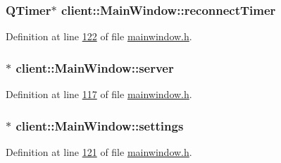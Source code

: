 \hypertarget{classclient_1_1_main_window_a5ee3a3827379da6df9f7e0348fa9d91d}{
\subsubsection[{reconnect\-Timer}]{\setlength{\rightskip}{0pt plus 5cm}Q\-Timer$\ast$ client\-::\-Main\-Window\-::reconnect\-Timer\hspace{0.3cm}{\ttfamily [private]}}}\label{d2/da4/classclient_1_1_main_window_a5ee3a3827379da6df9f7e0348fa9d91d}


Definition at line \hyperlink{mainwindow_8h_source_l00122}{122} of file \hyperlink{mainwindow_8h_source}{mainwindow.\-h}.

\hypertarget{classclient_1_1_main_window_a4766f55e461fd529caa84bf953e5151c}{
\subsubsection[{server}]{$\ast$ client\-::\-Main\-Window\-::server\hspace{0.3cm}{\ttfamily [private]}}}\label{d2/da4/classclient_1_1_main_window_a4766f55e461fd529caa84bf953e5151c}


Definition at line \hyperlink{mainwindow_8h_source_l00117}{117} of file \hyperlink{mainwindow_8h_source}{mainwindow.\-h}.

\hypertarget{classclient_1_1_main_window_a2ae4ecf491386322fd60aee80ba9f9c7}{
\subsubsection[{settings}]{$\ast$ client\-::\-Main\-Window\-::settings\hspace{0.3cm}{\ttfamily [private]}}}\label{d2/da4/classclient_1_1_main_window_a2ae4ecf491386322fd60aee80ba9f9c7}


Definition at line \hyperlink{mainwindow_8h_source_l00121}{121} of file \hyperlink{mainwindow_8h_source}{mainwindow.\-h}.

